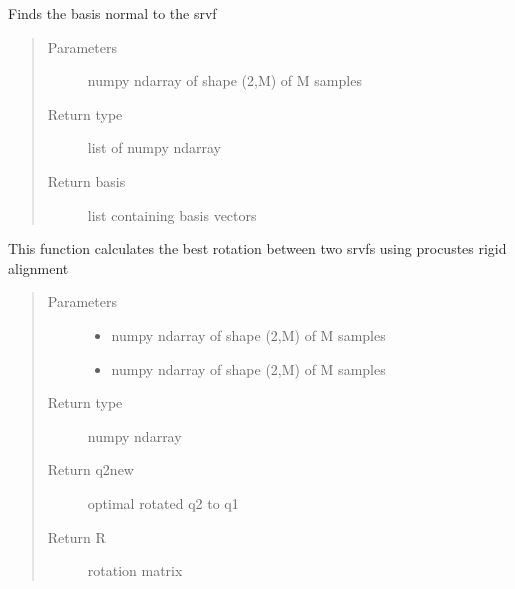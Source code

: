\documentclass[letterpaper,10pt,english]{sphinxmanual}
\begin{document}

\begin{fulllineitems}
\label{\detokenize{curve_functions:curve_functions.find_basis_normal}}
Finds the basis normal to the srvf
\begin{quote}\begin{description}
\item[{Parameters}] \leavevmode
{} \textendash{} numpy ndarray of shape (2,M) of M samples

\item[{Return type}] \leavevmode
list of numpy ndarray

\item[{Return basis}] \leavevmode
list containing basis vectors

\end{description}\end{quote}

\end{fulllineitems}


\begin{fulllineitems}
\label{\detokenize{curve_functions:curve_functions.find_best_rotation}}
This function calculates the best rotation between two srvfs using
procustes rigid alignment
\begin{quote}\begin{description}
\item[{Parameters}] \leavevmode\begin{itemize}
\item {} 
 \textendash{} numpy ndarray of shape (2,M) of M samples

\item {} 
 \textendash{} numpy ndarray of shape (2,M) of M samples

\end{itemize}

\item[{Return type}] \leavevmode
numpy ndarray

\item[{Return q2new}] \leavevmode
optimal rotated q2 to q1

\item[{Return R}] \leavevmode
rotation matrix

\end{description}\end{quote}

\end{fulllineitems}
\end{document}
